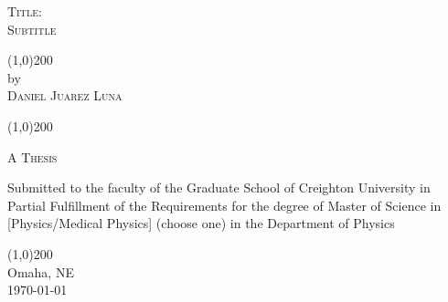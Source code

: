 

	\begin{center}
		{\LARGE \scshape{Title: \\\large Subtitle}} %
		
		
		\vspace{4cm}
		\line(1,0){200} \\
		\vspace*{0.5cm}
		by \\	
		\vspace*{0.5cm}
		\large \scshape{
		Daniel Juarez Luna}
		\vspace*{0.5cm}
		
		\line(1,0){200}
		
		\vspace{3cm}
		\textsc{
		A Thesis }

		
		\vspace{2cm}
	\textnormal{	Submitted to the faculty of the Graduate School of Creighton University in Partial
Fulfillment of the Requirements for the degree of Master of Science in [Physics/Medical Physics] (choose one) in the Department of Physics}
		
		\vspace{1cm}
		\line(1,0){200} \\	
		\vspace*{1cm}	\textnormal{
		Omaha, NE\\
		\today}
	\thispagestyle{empty}
	\end{center}
